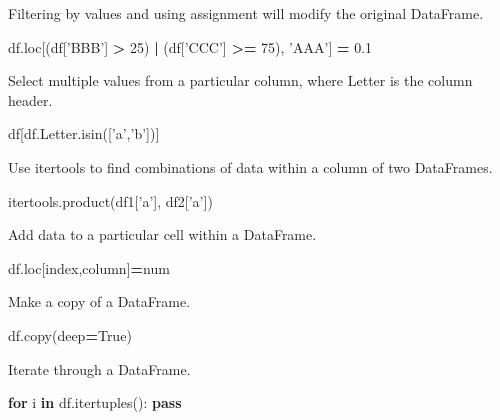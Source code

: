 \documentclass[]{book}
\newenvironment{Shaded}{\begin{snugshade}}{\end{snugshade}}
\newcommand{\KeywordTok}[1]{\textcolor[rgb]{0.13,0.29,0.53}{\textbf{#1}}}
\newcommand{\DecValTok}[1]{\textcolor[rgb]{0.00,0.00,0.81}{#1}}
\newcommand{\FloatTok}[1]{\textcolor[rgb]{0.00,0.00,0.81}{#1}}
\newcommand{\StringTok}[1]{\textcolor[rgb]{0.31,0.60,0.02}{#1}}
\newcommand{\VariableTok}[1]{\textcolor[rgb]{0.00,0.00,0.00}{#1}}
\newcommand{\ControlFlowTok}[1]{\textcolor[rgb]{0.13,0.29,0.53}{\textbf{#1}}}
\newcommand{\OperatorTok}[1]{\textcolor[rgb]{0.81,0.36,0.00}{\textbf{#1}}}
\newcommand{\NormalTok}[1]{#1}
\begin{document}
Filtering by values and using assignment will modify the original
DataFrame.

\begin{Shaded}
\begin{Highlighting}[]
\NormalTok{df.loc[(df[}\StringTok{'BBB'}\NormalTok{] }\OperatorTok{>} \DecValTok{25}\NormalTok{) }\OperatorTok{|}\NormalTok{ (df[}\StringTok{'CCC'}\NormalTok{] }\OperatorTok{>=} \DecValTok{75}\NormalTok{), }\StringTok{'AAA'}\NormalTok{] }\OperatorTok{=} \FloatTok{0.1}
\end{Highlighting}
\end{Shaded}

Select multiple values from a particular column, where Letter is the
column header.

\begin{Shaded}
\begin{Highlighting}[]
\NormalTok{df[df.Letter.isin([}\StringTok{'a'}\NormalTok{,}\StringTok{'b'}\NormalTok{])]}
\end{Highlighting}
\end{Shaded}

Use itertools to find combinations of data within a column of two
DataFrames.

\begin{Shaded}
\begin{Highlighting}[]
\NormalTok{itertools.product(df1[}\StringTok{'a'}\NormalTok{], df2[}\StringTok{'a'}\NormalTok{])}
\end{Highlighting}
\end{Shaded}

Add data to a particular cell within a DataFrame.

\begin{Shaded}
\begin{Highlighting}[]
\NormalTok{df.loc[index,column]}\OperatorTok{=}\NormalTok{num}
\end{Highlighting}
\end{Shaded}

Make a copy of a DataFrame.

\begin{Shaded}
\begin{Highlighting}[]
\NormalTok{df.copy(deep}\OperatorTok{=}\VariableTok{True}\NormalTok{)}
\end{Highlighting}
\end{Shaded}

Iterate through a DataFrame.

\begin{Shaded}
\begin{Highlighting}[]
\ControlFlowTok{for}\NormalTok{ i }\KeywordTok{in}\NormalTok{ df.itertuples():}
    \ControlFlowTok{pass}
\end{Highlighting}
\end{Shaded}
\end{document}
